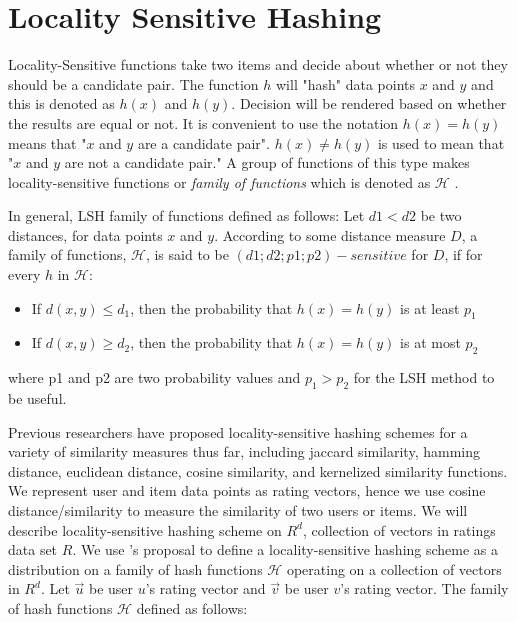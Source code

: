 \documentclass[conference]{IEEEtran}
\begin{document}
\section{Locality Sensitive Hashing}
\label{sec:lsh}

Locality-Sensitive functions take two items and decide about whether or not
they should be a candidate pair. The function $h$ will "hash" data points $x$
and $y$ and this is denoted as $h(x)$ and $h(y)$. Decision will be rendered 
based on whether the results are equal or not. It is convenient to use the 
notation $h(x) = h(y)$ means that "$x$ and $y$ are a candidate pair". 
$h(x) \neq h(y)$ is used to mean that "$x$ and $y$ are not a candidate pair." 
A group of functions of this type makes locality-sensitive functions or 
\textit{family of functions} which is denoted as $\mathcal{H}$ 
\cite[p.~86]{Rajaraman:2011:MMD:2124405}.

In general, LSH family of functions defined as follows: Let $d1 < d2$ be two
distances, for data points $x$ and $y$. According to some distance measure $D$,
a family of functions, $\mathcal{H}$, is said to be $(d1; d2; p1; p2)-sensitive$ 
for $D$, if for every $h$ in $\mathcal{H}$:

\begin{itemize}
\item If $d(x, y) \leq d_1$, then the probability that $h(x) = h(y)$ is at least $p_1$
\item If $d(x, y) \geq d_2$, then the probability that $h(x) = h(y)$ is at most $p_2$
\end{itemize}

where p1 and p2 are two probability values and $p_1 > p_2$ for the LSH method
to be useful.

Previous researchers have proposed locality-sensitive hashing schemes for a
variety of similarity measures thus far, including jaccard similarity, hamming
distance, euclidean distance, cosine similarity, and kernelized similarity 
functions.
We represent user and item data points as rating vectors, hence
we use cosine distance/similarity to measure the similarity of two users or
items. We will describe locality-sensitive hashing scheme on $R^d$, collection 
of vectors in ratings data set $R$. We use \cite{DBLP:conf/stoc/Charikar02}'s 
proposal  to define a locality-sensitive hashing scheme 
as a distribution on a family of hash functions $\mathcal{H}$ operating on a 
collection of vectors in $R^d$. Let $\vec{u}$ be user $u$'s rating vector and 
$\vec{v}$ be user $v$'s rating vector. The family of hash functions 
$\mathcal{H}$ defined as follows:
\end{document}
